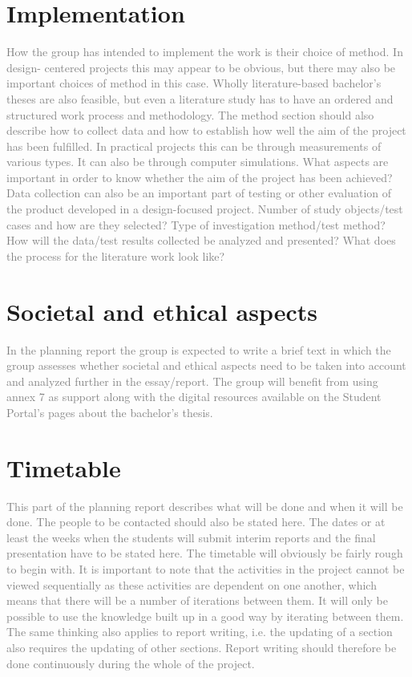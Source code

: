 \documentclass[12pt,a4paper]{article}
\begin{document}
\section{Implementation}
\textcolor{gray}{
How the group has intended to implement the work is their choice of method. In design-
centered projects this may appear to be obvious, but there may also be important choices of
method in this case. Wholly literature-based bachelor’s theses are also feasible, but even a
literature study has to have an ordered and structured work process and methodology.
The method section should also describe how to collect data and how to establish how well
the aim of the project has been fulfilled. In practical projects this can be through
measurements of various types. It can also be through computer simulations. What aspects
are important in order to know whether the aim of the project has been achieved? Data
collection can also be an important part of testing or other evaluation of the product
developed in a design-focused project.
Number of study objects/test cases and how are they selected? Type of investigation
method/test method? How will the data/test results collected be analyzed and presented?
What does the process for the literature work look like?
}
\section{Societal and ethical aspects}
\textcolor{gray}{
In the planning report the group is expected to write a brief text in which the group assesses
whether societal and ethical aspects need to be taken into account and analyzed further in
the essay/report. The group will benefit from using annex 7 as support along with the digital
resources available on the Student Portal’s pages about the bachelor’s thesis.
}
\section{Timetable}
\textcolor{gray}{
This part of the planning report describes what will be done and when it will be done. The
people to be contacted should also be stated here. The dates or at least the weeks when the
students will submit interim reports and the final presentation have to be stated here. The
timetable will obviously be fairly rough to begin with.
It is important to note that the activities in the project cannot be viewed sequentially as
these activities are dependent on one another, which means that there will be a number of
iterations between them. It will only be possible to use the knowledge built up in a good way
by iterating between them. The same thinking also applies to report writing, i.e. the
updating of a section also requires the updating of other sections. Report writing should
therefore be done continuously during the whole of the project.
}
\end{document}
